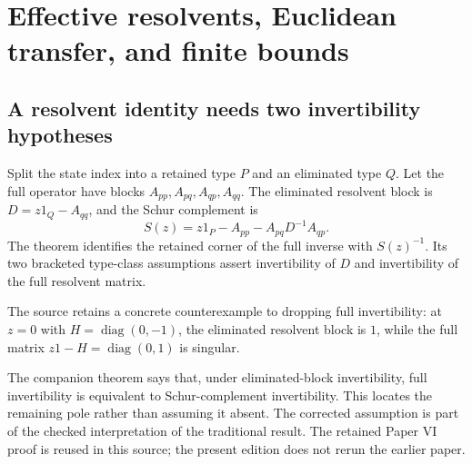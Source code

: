 \section{Effective resolvents, Euclidean transfer, and finite bounds}
\label{sec:finite-limits}

\subsection{A resolvent identity needs two invertibility hypotheses}
Split the state index into a retained type $P$ and an eliminated type $Q$. Let the full operator have blocks $A_{pp},A_{pq},A_{qp},A_{qq}$. The eliminated resolvent block is $D=z1_Q-A_{qq}$, and the Schur complement is
\[
S(z)=z1_P-A_{pp}-A_{pq}D^{-1}A_{qp}.
\]
The theorem identifies the retained corner of the full inverse with $S(z)^{-1}$. Its two bracketed type-class assumptions assert invertibility of $D$ and invertibility of the full resolvent matrix.




The source retains a concrete counterexample to dropping full invertibility: at $z=0$ with $H=\operatorname{diag}(0,-1)$, the eliminated resolvent block is $1$, while the full matrix $z1-H=\operatorname{diag}(0,1)$ is singular.


The companion  theorem says that, under eliminated-block invertibility, full invertibility is equivalent to Schur-complement invertibility. This locates the remaining pole rather than assuming it absent. The corrected assumption is part of the checked interpretation of the traditional result. The retained Paper VI proof is reused in this source; the present edition does not rerun the earlier paper.

